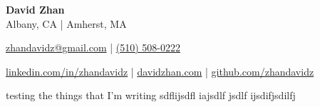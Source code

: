 \documentclass[letterpaper,10pt]{extarticle}
\begin{document}
\pagestyle{empty}

\begin{center}
\textbf{\Large David Zhan}\\[2pt] %
Albany, CA | Amherst, MA

\href{mailto:zhandavidz@gmail.com}{zhandavidz@gmail.com} | \href{tel:5105080222}{(510) 508-0222}

\href{https://www.linkedin.com/in/zhandavidz}{linkedin.com/in/zhandavidz} | \href{https://davidzhan.com}{davidzhan.com} | \href{https://github.com/zhandavidz}{github.com/zhandavidz}
\end{center}

testing the things that I'm writing sdflijsdfl iajsdlf jsdlf ijsdifjsdilfj 


\end{document}

